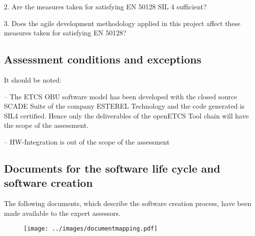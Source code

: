 2. Are the measures taken for satisfying EN 50128 SIL 4 sufficient?

3. Does the agile development methodology applied in this project affect these measures taken for satisfying EN 50128?


\bigskip

\subsection{Assessment conditions and exceptions}
It should be noted:

{}-- The ETCS OBU software model has been developed with the closed source SCADE Suite of the company ESTEREL Technology and the
code generated is SIL4 certified. Hence only the deliverables of the openETCS Tool chain will have the scope of the
assessment.

{}-- HW-Integration is out of the scope of the assessment

\subsection{Documents for the software life cycle
and software creation}
The following documents, which describe the software creation process, have been made available to the expert assessors.


\bigskip


\begin{figure}
\label{documentmapping} 
\centering
\texttt{[image: ../images/documentmapping.pdf]}
\end{figure}



